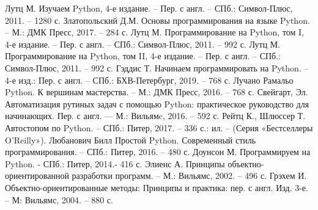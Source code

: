 
\begin{thebibliography}{9}

     Лутц М. Изучаем Python, 4-е издание. – Пер. с англ. – СПб.: Символ-Плюс, 2011. – 1280 с.
     Златопольский Д.М. Основы программирования на языке Python. – М.: ДМК Пресс, 2017. – 284 с.
     Лутц М. Программирование на Python, том I, 4-е издание. – Пер. с англ. – СПб.: Символ-Плюс, 2011. – 992 с.
     Лутц М. Программирование на Python, том II, 4-е издание. – Пер. с англ. – СПб.: Символ-Плюс, 2011. – 992 с.
	 Гэддис Т. Начинаем программировать на Python.  – 4-е изд.: Пер. с англ. – СПб.: БХВ-Петербург, 2019. – 768 с.
	 Лучано Рамальо Python. К вершинам мастерства. – М.: ДМК Пресс, 2016. – 768 с.
	 Свейгарт, Эл. Автоматизация рутиных задач с помощью Python: практическое руководство для начинающих. Пер. с англ. — М.: Вильямc, 2016. – 592 с.
	 Рейтц К., Шлюссер Т. Автостопом по Python. – СПб.: Питер, 2017. – 336 с.: ил. – (Серия «Бестселлеры O’Reilly»).
	 Любанович Билл Простой Python. Современный стиль программирования. – СПб.: Питер, 2016. – 480 с.
	 Доунсон М. Программируем на Python. - СПб.: Питер, 2014.- 416 с.
	 Элиенс А. Принципы объектно-ориентированной разработки программ. – М.: Вильямс, 2002. – 496 с.
	 Грэхем И. Объектно-ориентированные методы: Принципы и практика: пер. с англ. Изд. 3-е. – М: Вильямс, 2004. – 880 с.
\end{thebibliography}
